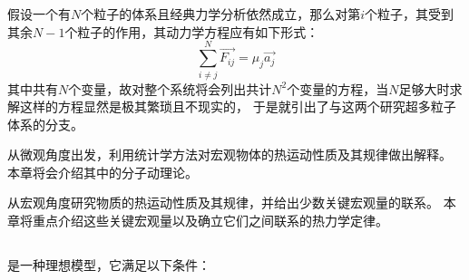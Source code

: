 %
\chapter[热力学]{}
    \section[导论]{}
        假设一个有$N$个粒子的体系且经典力学分析依然成立，那么对第$i$个粒子，其受到其余$N-1$个粒子的作用，其动力学方程应有如下形式：
        \begin{equation}
            \sum_{i\neq j}^N \vec{F_{ij}} = \mu_j \vec{a_j}
            \nonumber
        \end{equation}    
        其中共有$N$个变量，故对整个系统将会列出共计$N^2$个变量的方程，当$N$足够大时求解这样的方程显然是极其繁琐且不现实的，
        于是就引出了与\linebreak 这两个研究超多粒子体系的分支。

        从微观角度出发，利用统计学方法对宏观物体的热运动性质及其规律做出解释。
        本章将会介绍其中的分子动理论。

        从宏观角度研究物质的热运动性质及其规律，并给出少数关键宏观量的联系。
        本章将重点介绍这些关键宏观量以及确立它们之间联系的热力学定律。
    \section[理想气体]{}
        是一种理想模型，它满足以下条件：
        
